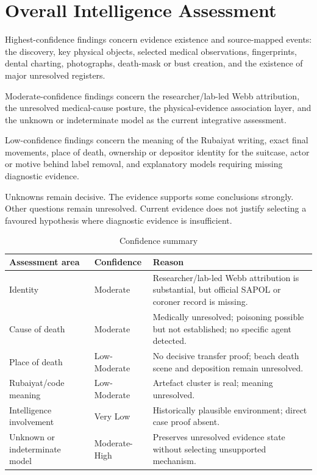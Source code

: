 \section{Overall Intelligence Assessment}

Highest-confidence findings concern evidence existence and source-mapped events: the discovery, key physical objects, selected medical observations, fingerprints, dental charting, photographs, death-mask or bust creation, and the existence of major unresolved registers.

Moderate-confidence findings concern the researcher/lab-led Webb attribution, the unresolved medical-cause posture, the physical-evidence association layer, and the unknown or indeterminate model as the current integrative assessment.

Low-confidence findings concern the meaning of the Rubaiyat writing, exact final movements, place of death, ownership or depositor identity for the suitcase, actor or motive behind label removal, and explanatory models requiring missing diagnostic evidence.

Unknowns remain decisive. The evidence supports some conclusions strongly. Other questions remain unresolved. Current evidence does not justify selecting a favoured hypothesis where diagnostic evidence is insufficient.

\begin{table}[htbp]
\centering
\caption{Confidence summary}
\label{tab:chapter12-confidence-summary}
\scriptsize
\setlength{\tabcolsep}{2pt}
\renewcommand{\arraystretch}{1.12}
\begin{tabularx}{\textwidth}{>{\raggedright\arraybackslash}p{}>{\raggedright\arraybackslash}p{}>{\raggedright\arraybackslash}X}
\toprule
Assessment area & Confidence & Reason \\
\midrule
Identity & Moderate & Researcher/lab-led Webb attribution is substantial, but official SAPOL or coroner record is missing. \\
Cause of death & Moderate & Medically unresolved; poisoning possible but not established; no specific agent detected. \\
Place of death & Low-Moderate & No decisive transfer proof; beach death scene and deposition remain unresolved. \\
Rubaiyat/code meaning & Low-Moderate & Artefact cluster is real; meaning unresolved. \\
Intelligence involvement & Very Low & Historically plausible environment; direct case proof absent. \\
Unknown or indeterminate model & Moderate-High & Preserves unresolved evidence state without selecting unsupported mechanism. \\
\bottomrule
\end{tabularx}
\end{table}

